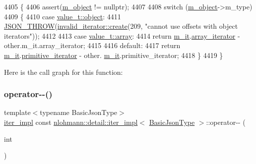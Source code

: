 \begin{DoxyCode}
4405     \{
4406         assert(\hyperlink{classnlohmann_1_1detail_1_1iter__impl_aca84f84be598bdfaaddd23d928c42bbb}{m\_object} != \textcolor{keyword}{nullptr});
4407 
4408         \textcolor{keywordflow}{switch} (\hyperlink{classnlohmann_1_1detail_1_1iter__impl_aca84f84be598bdfaaddd23d928c42bbb}{m\_object}->m\_type)
4409         \{
4410             \textcolor{keywordflow}{case} \hyperlink{namespacenlohmann_1_1detail_a1ed8fc6239da25abcaf681d30ace4985aa8cfde6331bd59eb2ac96f8911c4b666}{value\_t::object}:
4411                 \hyperlink{json_8hpp_a6c274f6db2e65c1b66c7d41b06ad690f}{JSON\_THROW}(\hyperlink{classnlohmann_1_1detail_1_1invalid__iterator_a4e849260a3caa1b288c7e619130c6c09}{invalid\_iterator::create}(209, \textcolor{stringliteral}{"cannot use
       offsets with object iterators"}));
4412 
4413             \textcolor{keywordflow}{case} \hyperlink{namespacenlohmann_1_1detail_a1ed8fc6239da25abcaf681d30ace4985af1f713c9e000f5d3f280adbd124df4f5}{value\_t::array}:
4414                 \textcolor{keywordflow}{return} \hyperlink{classnlohmann_1_1detail_1_1iter__impl_a8a86a7c0d4af0cc4ab345b6f0e13cdfa}{m\_it}.\hyperlink{structnlohmann_1_1detail_1_1internal__iterator_a8294a6e6f01b58e1cce8fbae66a50b5d}{array\_iterator} - other.m\_it.array\_iterator;
4415 
4416             \textcolor{keywordflow}{default}:
4417                 \textcolor{keywordflow}{return} \hyperlink{classnlohmann_1_1detail_1_1iter__impl_a8a86a7c0d4af0cc4ab345b6f0e13cdfa}{m\_it}.\hyperlink{structnlohmann_1_1detail_1_1internal__iterator_a2b3bb45f968210e42c282017eeeb63a8}{primitive\_iterator} - other.
      \hyperlink{classnlohmann_1_1detail_1_1primitive__iterator__t_a4357355113b0cd7e12b15c2e93703510}{m\_it}.primitive\_iterator;
4418         \}
4419     \}
\end{DoxyCode}
Here is the call graph for this function\+:
\mbox{\label{classnlohmann_1_1detail_1_1iter__impl_a1fc43e764467b8ea4a4cdd01f629d757}} 
\subsubsection{\texorpdfstring{operator-\/-\/()}{operator--()}\hspace{0.1cm}{\footnotesize\ttfamily [1/2]}}
{\footnotesize\ttfamily template$<$typename Basic\+Json\+Type$>$ \\
\hyperlink{classnlohmann_1_1detail_1_1iter__impl}{iter\+\_\+impl} const \hyperlink{classnlohmann_1_1detail_1_1iter__impl}{nlohmann\+::detail\+::iter\+\_\+impl}$<$ \hyperlink{classnlohmann_1_1detail_1_1iter__impl_abf18f18793f84b0222aebb5a2a87da7a}{Basic\+Json\+Type} $>$\+::operator-\/-\/ (\begin{DoxyParamCaption}\item[{int}]{ }\end{DoxyParamCaption})\hspace{0.3cm}{\ttfamily [inline]}}



